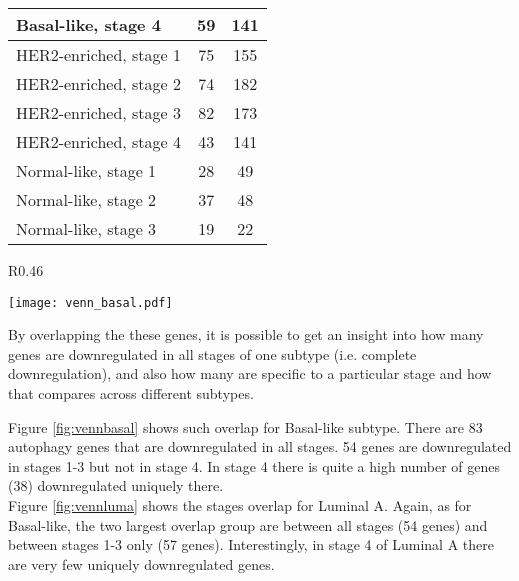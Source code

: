 \begin{table}[!h]
\begin{tabular}{l|c|c}
\multicolumn{1}{|l|}{Basal-like, stage 4} & 59 & \multicolumn{1}{c|}{141} \\ \hline\hline
\multicolumn{1}{|l|}{HER2-enriched, stage 1} & 75 & \multicolumn{1}{c|}{155} \\ \hline
\multicolumn{1}{|l|}{HER2-enriched, stage 2} & 74 & \multicolumn{1}{c|}{182} \\ \hline
\multicolumn{1}{|l|}{HER2-enriched, stage 3} & 82 & \multicolumn{1}{c|}{173} \\ \hline
\multicolumn{1}{|l|}{HER2-enriched, stage 4} & 43 & \multicolumn{1}{c|}{141} \\ \hline\hline
\multicolumn{1}{|l|}{Normal-like, stage 1} & 28 & \multicolumn{1}{c|}{49} \\ \hline
\multicolumn{1}{|l|}{Normal-like, stage 2} & 37 & \multicolumn{1}{c|}{48} \\ \hline
\multicolumn{1}{|l|}{Normal-like, stage 3} & 19 & \multicolumn{1}{c|}{22} \\ \hline
\end{tabular}
\end{table}

\newpage


\begin{wrapfigure}{R}{0.46\textwidth}
        \hfill
        \captionsetup{justification=centering}
        \centerline{ \texttt{[image: venn\_basal.pdf]}}
        
        \vspace*{-4mm}
        \caption[Overlap between downregulated autophagy genes in stages of Basal-like subtype]{\label{fig:vennbasal}Overlap between downregulated autophagy genes in stages of Basal-like subtype}
        \end{wrapfigure}
 

By overlapping the these genes, it is possible to get an insight into how many genes are downregulated in all stages of one subtype (i.e. complete downregulation), and also how many are specific to a particular stage and how that compares across different subtypes.

Figure \ref{fig:vennbasal} shows such overlap for Basal-like subtype. There are 83 autophagy genes that are downregulated in all stages. 54 genes are downregulated in stages 1-3 but not in stage 4. In stage 4 there is quite a high number of genes (38) downregulated uniquely there.\\
Figure \ref{fig:vennluma} shows the stages overlap for Luminal A. Again, as for Basal-like, the two largest overlap group are between all stages (54 genes) and between stages 1-3 only (57 genes). Interestingly, in stage 4 of Luminal A there are very few uniquely downregulated genes.\\


